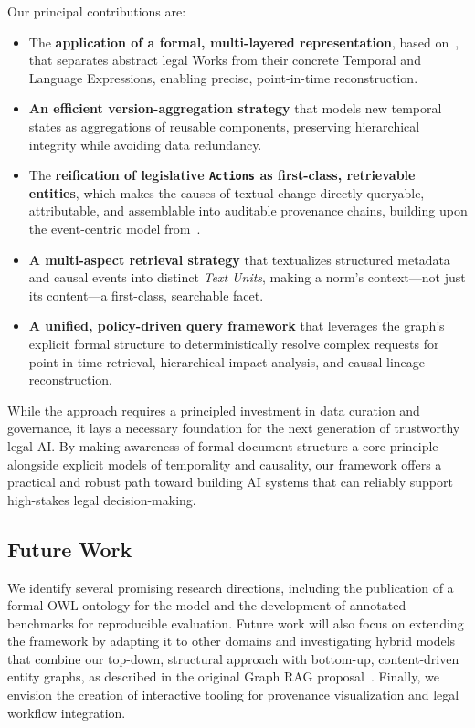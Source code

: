 \documentclass[11pt]{article}
\begin{document}
Our principal contributions are:
\begin{itemize}
    \item The \textbf{application of a formal, multi-layered representation}, based on~\cite{demartim2025temporal}, that separates abstract legal Works from their concrete Temporal and Language Expressions, enabling precise, point-in-time reconstruction.
    \item \textbf{An efficient version-aggregation strategy} that models new temporal states as aggregations of reusable components, preserving hierarchical integrity while avoiding data redundancy.
    \item The \textbf{reification of legislative \texttt{Actions} as first-class, retrievable entities}, which makes the causes of textual change directly queryable, attributable, and assemblable into auditable provenance chains, building upon the event-centric model from~\cite{demartim2025temporal}.
    \item \textbf{A multi-aspect retrieval strategy} that textualizes structured metadata and causal events into distinct \textit{Text Units}, making a norm's context—not just its content—a first-class, searchable facet.
    \item \textbf{A unified, policy-driven query framework} that leverages the graph's explicit formal structure to deterministically resolve complex requests for point-in-time retrieval, hierarchical impact analysis, and causal-lineage reconstruction.
\end{itemize}

While the approach requires a principled investment in data curation and governance, it lays a necessary foundation for the next generation of trustworthy legal AI. By making awareness of formal document structure a core principle alongside explicit models of temporality and causality, our framework offers a practical and robust path toward building AI systems that can reliably support high-stakes legal decision-making.

\subsection*{Future Work}
We identify several promising research directions, including the publication of a formal OWL ontology for the model and the development of annotated benchmarks for reproducible evaluation. Future work will also focus on extending the framework by adapting it to other domains and investigating hybrid models that combine our top-down, structural approach with bottom-up, content-driven entity graphs, as described in the original Graph RAG proposal~\cite{edge2024graphrag}. Finally, we envision the creation of interactive tooling for provenance visualization and legal workflow integration.

 

\end{document}
